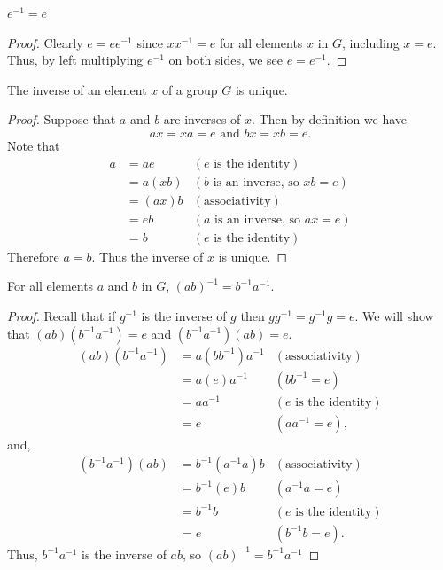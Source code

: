 \begin{proposition}\label{prop-inverse-of-identity-is-identity}
    $e^{-1} = e$
\end{proposition}
\begin{proof}
    Clearly $e = ee^{-1}$ since $xx^{-1} = e$ for all elements $x$ in $G$, including $x = e$. Thus, by left multiplying $e^{-1}$ on both sides, we see $e = e^{-1}$.
\end{proof}

\newpage

\begin{proposition}\label{prop-inverse-of-element-is-unique}
    The inverse of an element $x$ of a group $G$ is unique.
\end{proposition}
\begin{proof}
    Suppose that $a$ and $b$ are inverses of $x$. Then by definition we have
    \[
        ax = xa = e \text{ and } bx = xb = e.
    \]
    Note that
    \begin{align*}
        a &= ae & (e \text{ is the identity})\\
        &= a(xb) & (b \text{ is an inverse, so } xb = e)\\
        &= (ax)b & (\text{associativity})\\
        &= eb & (a \text{ is an inverse, so } ax = e)\\
        &= b & (e \text{ is the identity})
    \end{align*}
    Therefore $a = b$. Thus the inverse of $x$ is unique.
\end{proof}

\begin{proposition}
    For all elements $a$ and $b$ in $G$, $(ab)^{-1} = b^{-1}a^{-1}$.
\end{proposition}
\begin{proof}
    Recall that if $g^{-1}$ is the inverse of $g$ then $gg^{-1} = g^{-1}g = e$. We will show that $(ab)(b^{-1}a^{-1}) = e$ and $(b^{-1}a^{-1})(ab) = e$.
    \begin{align*}
        (ab)(b^{-1}a^{-1}) &= a(bb^{-1})a^{-1} & (\text{associativity})\\
        &= a(e)a^{-1} & (bb^{-1} = e)\\
        &= aa^{-1} & (e \text{ is the identity})\\
        &= e & (aa^{-1} = e),
    \end{align*}
    and,
    \begin{align*}
        (b^{-1}a^{-1})(ab) &= b^{-1}(a^{-1}a)b & (\text{associativity})\\
        &= b^{-1}(e)b & (a^{-1}a = e)\\
        &= b^{-1}b & (e \text{ is the identity})\\
        &= e & ( b^{-1}b = e).
    \end{align*}
    Thus, $b^{-1}a^{-1}$ is the inverse of $ab$, so $(ab)^{-1} = b^{-1}a^{-1}$
\end{proof}

